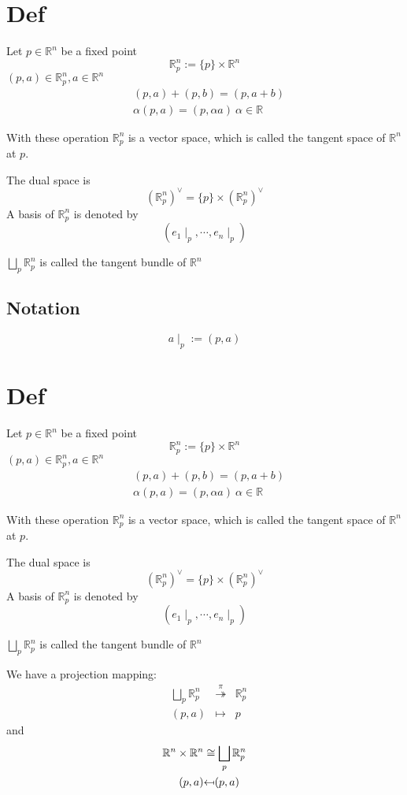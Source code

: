 \documentclass{book}
\begin{document}
\section{Def}

Let $p\in \mathbb{R}^n$ be a fixed point
$$\mathbb{R}^n_p:=\{p\}\times\mathbb{R}^n$$
$(p,a)\in \mathbb{R}^n_p,a\in \mathbb{R}^n$
$$\begin{aligned}
    &(p,a)+(p,b)=(p,a+b)\\ &\alpha(p,a)=(p,\alpha a)\  \alpha\in \mathbb{R}
\end{aligned}$$

With these operation $\mathbb{R}^n_p$ is a vector space, which is called the tangent space of $\mathbb{R}^n$ at $p$.

The dual space is $$(\mathbb{R}^n_p)^\vee=\{p\}\times(\mathbb{R}_p^n)^\vee$$
A basis of $\mathbb{R}_p^n$ is denoted by $$(e_1\mid_p,\cdots,e_n\mid_p)$$

$\bigsqcup\limits_p \mathbb{R}^n_p$ is called the tangent bundle of $\mathbb{R}^n$
\subsection{Notation}
$$a\mid_p:=(p,a)$$
\section{Def}

Let $p\in \mathbb{R}^n$ be a fixed point
$$\mathbb{R}^n_p:=\{p\}\times\mathbb{R}^n$$
$(p,a)\in \mathbb{R}^n_p,a\in \mathbb{R}^n$
$$\begin{aligned}
    &(p,a)+(p,b)=(p,a+b)\\ &\alpha(p,a)=(p,\alpha a)\  \alpha\in \mathbb{R}
\end{aligned}$$

With these operation $\mathbb{R}^n_p$ is a vector space, which is called the tangent space of $\mathbb{R}^n$ at $p$.

The dual space is $$(\mathbb{R}^n_p)^\vee=\{p\}\times(\mathbb{R}_p^n)^\vee$$
A basis of $\mathbb{R}_p^n$ is denoted by $$(e_1\mid_p,\cdots,e_n\mid_p)$$

$\bigsqcup\limits_p \mathbb{R}^n_p$ is called the tangent bundle of $\mathbb{R}^n$

We have a projection mapping:
$$ 
\begin{aligned}
    &\bigsqcup \limits_{p}\mathbb{R}^n_p&\stackrel{\pi}{\twoheadrightarrow}&\mathbb{R}^n_p\\ &(p,a)&\mapsto &p
\end{aligned}$$
and 
$$
\begin{aligned}
    \mathbb{R}^n\times\mathbb{R}^n &\cong \bigsqcup \limits_{p}\mathbb{R}^n_p\\ (p,a) &\reflectbox{\ensuremath{\mapsto}} (p,a)
\end{aligned}
$$
\end{document}
